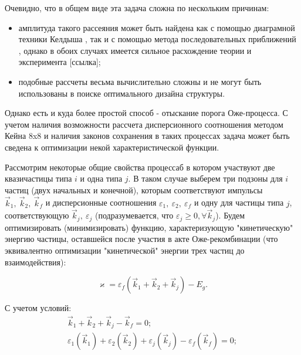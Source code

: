 \documentclass[../main.tex]{subfiles}
\begin{document}
        Очевидно, что в общем виде эта задача сложна по нескольким причинам:
        \begin{itemize}
            \item амплитуда такого рассеяния может быть найдена как с
                помощью диаграмной техники Келдыша \cite{AugerDiagrams}, 
                так и с помощью метода последовательных приближений \cite{SucApprAnd, SucApprAgr},
                однако в обоих случаях имеется сильное расхождение
                теории и эксперимента [ссылка];
            \item подобные рассчеты весьма вычислительно сложны и не могут
                быть использованы в поиске оптимального дизайна структуры.
        \end{itemize}

        Однако есть и куда более простой способ - отыскание порога Оже-процесса.
        С учетом наличия возможности рассчета дисперсионного соотношения методом Кейна 8x8
        \cite{HgCdTeCalcZholudev} и наличия законов сохранения в таких
        процессах задача может быть сведена к оптимизации некой характеристической
        функции.

        Рассмотрим некоторые общие свойства процессаб в котором участвуют две
        квазичастицы типа $i$ и одна типа $j$. В таком случае выберем три подзоны для 
        $i$ частиц (двух начальных и конечной), которым соответствуют импульсы 
        $\vec{k}_1,~\vec{k}_2,~\vec{k}_f$ и дисперсионные 
        соотношения $\varepsilon_1,~\varepsilon_2,~\varepsilon_f$ и одну для частицы типа $j$,
        соответствующую $\vec{k}_j,~\varepsilon_j$ (подразумевается, что 
        $\varepsilon_j \geq 0, \forall \vec{k}_j$). Будем оптимизировать (минимизировать) функцию, 
        характеризующую "кинетическую" энергию частицы, оставшейся после участия в акте Оже-рекомбинации 
        (что эквивалентно оптимизации "кинетической" энергии трех частиц до взаимодействия):
        
        \begin{equation}
            \varkappa = \varepsilon_f(\vec{k}_1 + \vec{k}_2 + \vec{k}_j) - E_g.
        \end{equation}

        С учетом условий:
        \begin{equation}
            \begin{array}{l}
                \vec{k}_1 + \vec{k}_2 + \vec{k}_j - \vec{k}_f = 0;\\
                \varepsilon_1(\vec{k}_1) + \varepsilon_2(\vec{k}_2) + \varepsilon_j(\vec{k}_j) - \varepsilon_f(\vec{k}_f) = 0;
            \end{array}
        \end{equation}
\end{document}
